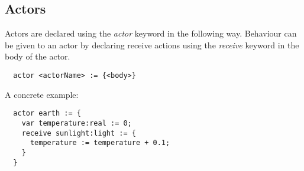 \subsection{Actors}
\label{subsec:actors}

Actors are declared using the \emph{actor} keyword in the following way. Behaviour can be given to an actor by declaring receive actions using the \emph{receive} keyword in the body of the actor.

\begin{verbatim}
  actor <actorName> := {<body>}
\end{verbatim}

A concrete example:

\begin{verbatim}
  actor earth := {
    var temperature:real := 0;
    receive sunlight:light := {
      temperature := temperature + 0.1;
    }
  }
\end{verbatim}
